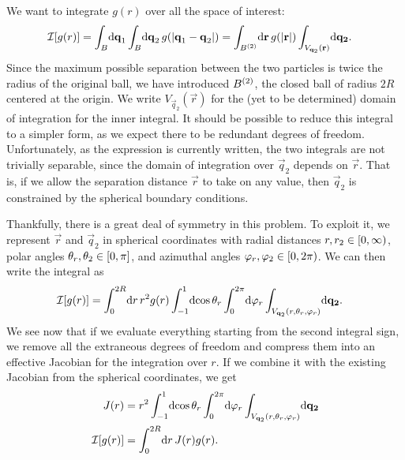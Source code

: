 We want to integrate $g(r)$ over all the space of interest:
\begin{align}
	\mathcal{I}[g(r)]
	&= \int_\ball\! \dif \vec{q}_1 \int_\ball\! \dif \vec{q}_2 \, g(\abs[0]{\vec{q}_1 - \vec{q}_2})
	= \int_{\ball^{(2)}}\! \dif \vec{r} \, g(\abs[0]{\vec{r}}) \int_{V_{\vec{q}_2}(\vec{r})}\! \dif \vec{q_2}.
\end{align}
Since the maximum possible separation between the two particles is twice the radius of the original ball, we have introduced $B^{(2)}$, the closed ball of radius $2 R$ centered at the origin.
We write $V_{\vec{q}_2}(\vec{r})$ for the (yet to be determined) domain of integration for the inner integral.
It should be possible to reduce this integral to a simpler form, as we expect there to be redundant degrees of freedom.
Unfortunately, as the expression is currently written, the two integrals are not trivially separable, since the domain of integration over $\vec{q}_2$ depends on $\vec{r}$.
That is, if we allow the separation distance $\vec{r}$ to take on any value, then $\vec{q}_2$ is constrained by the spherical boundary conditions.

Thankfully, there is a great deal of symmetry in this problem.
To exploit it, we represent $\vec{r}$ and $\vec{q}_2$ in spherical coordinates with radial distances $r, r_2 \in \intco{0, \infty}$, polar angles $\theta_r, \theta_2 \in \intcc{0, \pi}$, and azimuthal angles $\phi_r, \phi_2 \in \intco{0, 2 \pi}$.
We can then write the integral as
\begin{align}
	\mathcal{I}[g(r)]
	&= \int_0^{2 R}\! \dif r \, r^2 g(r) \int_{-1}^1\! \dif \cos{\theta_r} \int_0^{2 \pi}\! \dif \phi_r
		\int_{V_{\vec{q}_2}(r, \theta_r, \phi_r)}\! \dif \vec{q_2}.
\end{align}
We see now that if we evaluate everything starting from the second integral sign, we remove all the extraneous degrees of freedom and compress them into an effective Jacobian for the integration over $r$.
If we combine it with the existing Jacobian from the spherical coordinates, we get
\begin{subequations}
\begin{align}
	J(r)
	&= r^2 \int_{-1}^1\! \dif \cos{\theta_r} \int_0^{2 \pi}\! \dif \phi_r
		\int_{V_{\vec{q}_2}(r, \theta_r, \phi_r)}\! \dif \vec{q_2} \\
	\mathcal{I}[g(r)]
	&= \int_0^{2 R}\! \dif r \, J(r) g(r).
\end{align}
\end{subequations}


